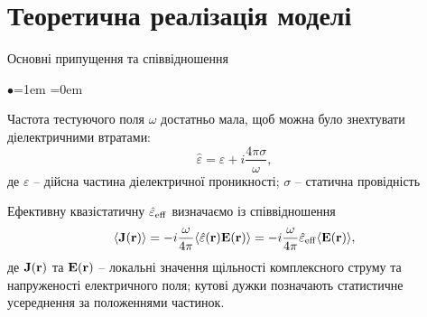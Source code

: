 \documentclass[10pt]{beamer}
\begin{document}
\section{Теоретична реалізація моделі}%
\begin{frame}{Основні припущення та співвідношення}

\begin{list}{$\bullet$}{\leftmargin=1em \itemindent=0em}\footnotesize

\item
Частота тестуючого поля $\omega$ достатньо мала, щоб можна було знехтувати діелектричними втратами: 
$$
    \hat{\varepsilon} = \varepsilon + i \frac{4\pi\sigma}{\omega},
$$
де $\varepsilon$ -- дійсна частина діелектричної проникності; $\sigma$ -- статична провідність

\item 
Ефективну квазістатичну $\hat{\varepsilon}_{\rm eff}$ визначаємо із співвідношення
\begin{equation}\label{eq:effcomplex} 
\langle {\bf{J}} ({\bf{r}})\rangle =
-i\frac{\omega}{4\pi}\langle \hat{\varepsilon} ({\bf{r}}) {\bf{E}}
({\bf{r}}) \rangle = -i\frac{\omega}{4\pi} \hat{\varepsilon}_{\rm
eff} \langle {\bf{E}} ({\bf{r}}) \rangle,
\end{equation}
де ${\bf J}({\bf{r}})$ та ${\bf E}({\bf{r}})$ -- локальні значення щільності комплексного струму та напруженості електричного поля; кутові дужки позначають статистичне усереднення за положеннями частинок.


\end{list}

\end{frame}
\end{document}
